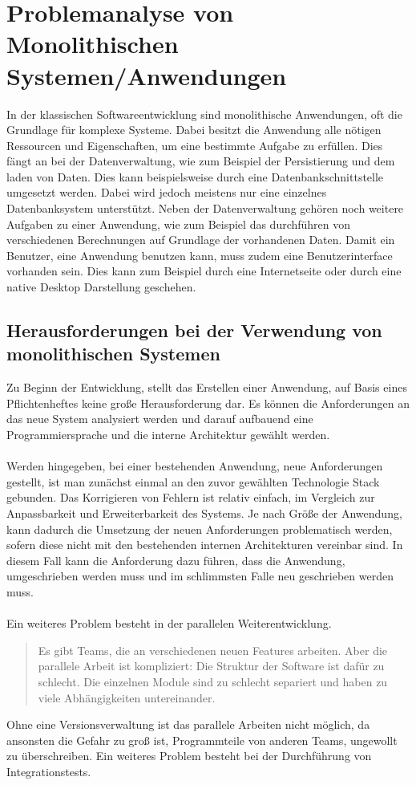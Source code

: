\chapter{Problemanalyse von Monolithischen Systemen/Anwendungen}
\label{chap:ProblemanalyseMonolithischeSysteme}
In der klassischen Softwareentwicklung sind monolithische Anwendungen, oft die Grundlage für komplexe Systeme. Dabei besitzt die Anwendung alle nötigen Ressourcen und Eigenschaften, um eine bestimmte Aufgabe zu erfüllen. Dies fängt an bei der Datenverwaltung, wie zum Beispiel der Persistierung und dem laden von Daten. Dies kann beispielsweise durch eine Datenbankschnittstelle umgesetzt werden. Dabei wird jedoch meistens nur eine einzelnes Datenbanksystem unterstützt. Neben der Datenverwaltung gehören noch weitere Aufgaben zu einer Anwendung, wie zum Beispiel das durchführen von verschiedenen Berechnungen auf Grundlage der vorhandenen Daten. Damit ein Benutzer, eine Anwendung benutzen kann, muss zudem eine Benutzerinterface vorhanden sein. Dies kann zum Beispiel durch eine Internetseite  oder durch eine native Desktop Darstellung geschehen.

\section{Herausforderungen bei der Verwendung von monolithischen Systemen}
\label{sec:HerausforderungenMonolithisch}
Zu Beginn der Entwicklung, stellt das Erstellen einer Anwendung, auf Basis eines Pflichtenheftes keine große Herausforderung dar. Es können die Anforderungen an das neue System analysiert werden und darauf aufbauend eine Programmiersprache und die interne Architektur gewählt werden.
\\\\
Werden hingegeben, bei einer bestehenden Anwendung, neue Anforderungen gestellt, ist man zunächst einmal an den zuvor gewählten Technologie Stack gebunden. Das Korrigieren von Fehlern ist relativ einfach, im Vergleich zur Anpassbarkeit und Erweiterbarkeit des Systems. Je nach Größe der Anwendung, kann dadurch die Umsetzung der neuen Anforderungen problematisch werden, sofern diese nicht mit den bestehenden internen Architekturen vereinbar sind. In diesem Fall kann die Anforderung dazu führen, dass die Anwendung, umgeschrieben werden muss und im schlimmsten Falle neu geschrieben werden muss.
\\\\
Ein weiteres Problem besteht in der parallelen Weiterentwicklung.
\begin{quotation}
    \frqq Es gibt Teams, die an verschiedenen neuen Features arbeiten. Aber die parallele Arbeit ist kompliziert: Die Struktur der Software ist dafür zu schlecht. Die einzelnen Module sind zu schlecht separiert und haben zu viele Abhängigkeiten untereinander. \flqq\ \cite[S. 16]{EWolff2016:Microservices}
\end{quotation}
Ohne eine Versionsverwaltung ist das parallele Arbeiten nicht möglich, da ansonsten die Gefahr zu groß ist, Programmteile von anderen Teams, ungewollt zu überschreiben. Ein weiteres Problem besteht bei der Durchführung von Integrationstests.

